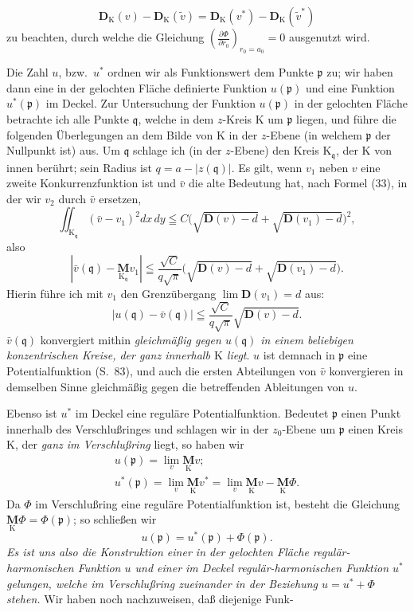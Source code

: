 \documentclass{article}
\begin{document}
\[ \mathbf{D}_{\mathrm{K}}(v) - \mathbf{D}_{\mathrm{K}}(\tilde{v}) = \mathbf{D}_{\mathrm{K}}(v^*) - \mathbf{D}_{\mathrm{K}}(\tilde{v}^*) \]
zu beachten, durch welche die Gleichung $\left(\frac{\partial\Phi}{\partial r_0}\right)_{r_0 = a_0} = 0$ ausgenutzt wird.

Die Zahl $u$, bzw.\ $u^*$ ordnen wir als Funktionswert dem Punkte $\mathfrak{p}$ zu; wir haben dann eine in der gelochten Fläche definierte Funktion $u(\mathfrak{p})$ und eine Funktion $u^*(\mathfrak{p})$ im Deckel. Zur Untersuchung der Funktion $u(\mathfrak{p})$ in der gelochten Fläche betrachte ich alle Punkte $\mathfrak{q}$, welche in dem $z$-Kreis $\mathrm{K}$ um $\mathfrak{p}$ liegen, und führe die folgenden Überlegungen an dem Bilde von $\mathrm{K}$ in der $z$-Ebene (in welchem $\mathfrak{p}$ der Nullpunkt ist) aus. Um $\mathfrak{q}$ schlage ich (in der $z$-Ebene) den Kreis $\mathrm{K}_\mathfrak{q}$, der $\mathrm{K}$ von innen berührt; sein Radius ist $q = a - |z(\mathfrak{q})|$. Es gilt, wenn $v_1$ neben $v$ eine zweite Konkurrenzfunktion ist und $\bar{v}$ die alte Bedeutung hat, nach Formel (33), in der wir $v_2$ durch $\bar{v}$ ersetzen,
\[ \iint_{\mathrm{K}_\mathfrak{q}} (\bar{v} - v_1)^2 dx\,dy \leqq C \bigl( \sqrt{\mathbf{D}(v) - d} + \sqrt{\mathbf{D}(v_1) - d} \bigr)^2, \]
also
\[ \left| \bar{v}(\mathfrak{q}) - \underset{\mathrm{K}_\mathfrak{q}}{\mathbf{M}} v_1 \right| \leqq \frac{\sqrt{C}}{q\sqrt{\pi}} \bigl( \sqrt{\mathbf{D}(v) - d} + \sqrt{\mathbf{D}(v_1) - d} \bigr). \]
Hierin führe ich mit $v_1$ den Grenzübergang $\lim\mathbf{D}(v_1) = d$ aus:
\[ |u(\mathfrak{q}) - \bar{v}(\mathfrak{q})| \leqq \frac{\sqrt{C}}{q\sqrt{\pi}} \sqrt{\mathbf{D}(v) - d}. \]
$\bar{v}(\mathfrak{q})$ konvergiert mithin \emph{gleichmäßig gegen $u(\mathfrak{q})$ in einem beliebigen konzentrischen Kreise, der ganz innerhalb $\mathrm{K}$ liegt}. $u$ ist demnach in $\mathfrak{p}$ eine Potentialfunktion (S.~83), und auch die ersten Abteilungen von $\bar{v}$ konvergieren in demselben Sinne gleichmäßig gegen die betreffenden Ableitungen von $u$.

Ebenso ist $u^*$ im Deckel eine reguläre Potentialfunktion. Bedeutet $\mathfrak{p}$ einen Punkt innerhalb des Verschlußringes und schlagen wir in der $z_0$-Ebene um $\mathfrak{p}$ einen Kreis $\mathrm{K}$, der \emph{ganz im Verschlußring} liegt, so haben wir
\[ \begin{gathered}
u(\mathfrak{p}) = \lim_v \underset{\mathrm{K}}{\mathbf{M}} v; \\
u^*(\mathfrak{p}) = \lim_v \underset{\mathrm{K}}{\mathbf{M}} v^* = \lim_v \underset{\mathrm{K}}{\mathbf{M}} v - \underset{\mathrm{K}}{\mathbf{M}} \Phi.
\end{gathered} \]
Da $\Phi$ im Verschlußring eine reguläre Potentialfunktion ist, besteht die Gleichung $\underset{\mathrm{K}}{\mathbf{M}} \Phi = \Phi(\mathfrak{p})$; so schließen wir
\[ u(\mathfrak{p}) = u^*(\mathfrak{p}) + \Phi(\mathfrak{p}). \]
\emph{Es ist uns also die Konstruktion einer in der gelochten Fläche regulär-harmonischen Funktion $u$ und einer im Deckel regulär-harmonischen Funktion $u^*$ gelungen, welche im Verschlußring zueinander in der Beziehung $u = u^* + \Phi$ stehen.} Wir haben noch nachzuweisen, daß diejenige Funk-
\end{document}
